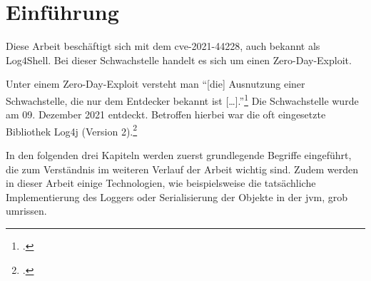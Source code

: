 
\section{Einführung}\label{sec:einfuhrung}
Diese Arbeit beschäftigt sich mit dem \gls{cve}-2021-44228, auch bekannt als Log4Shell.
Bei dieser Schwachstelle handelt es sich um einen Zero-Day-Exploit.

Unter einem Zero-Day-Exploit versteht man ``[die] Ausnutzung einer Schwachstelle, die nur dem Entdecker bekannt ist [\ldots].''\footcite{bsizeroday}
Die Schwachstelle wurde am 09. Dezember 2021 entdeckt.
Betroffen hierbei war die oft eingesetzte Bibliothek Log4j (Version 2).\footcite{lunasec}

In den folgenden drei Kapiteln werden zuerst grundlegende Begriffe eingeführt, die zum Verständnis im weiteren Verlauf der Arbeit wichtig sind.
Zudem werden in dieser Arbeit einige Technologien, wie beispielsweise die tatsächliche Implementierung des Loggers oder Serialisierung der Objekte in der \gls{jvm}, grob umrissen.




